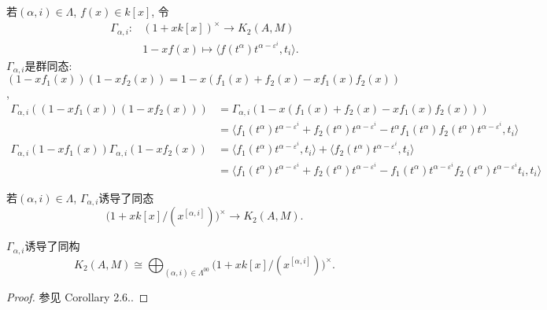 若$(\alpha, i)\in \Lambda$, $f(x)\in k[x]$, 令
\begin{align*}
\Gamma_{\alpha, i} \colon & (1+xk[x])^{\times} \longrightarrow K_2(A,M)\\
				& 1-xf(x)  \mapsto \langle f(t^\alpha)t^{\alpha-\varepsilon^i}, t_i \rangle.
\end{align*}
$\Gamma_{\alpha, i}$是群同态: $(1-xf_1(x))(1-xf_2(x)) = 1-x(f_1(x)+f_2(x)-xf_1(x)f_2(x))$, 
\begin{align*}
	\Gamma_{\alpha, i}((1-xf_1(x))(1-xf_2(x)))&=\Gamma_{\alpha, i}(1-x(f_1(x)+f_2(x)-xf_1(x)f_2(x)))\\
	&=\langle f_1(t^\alpha)t^{\alpha-\varepsilon^i}+f_2(t^\alpha)t^{\alpha-\varepsilon^i}-t^\alpha f_1(t^\alpha)f_2(t^\alpha)t^{\alpha-\varepsilon^i}, t_i \rangle \\
	\Gamma_{\alpha, i}(1-xf_1(x))\Gamma_{\alpha, i}(1-xf_2(x)) & = \langle f_1(t^\alpha)t^{\alpha-\varepsilon^i}, t_i \rangle +\langle f_2(t^\alpha)t^{\alpha-\varepsilon^i}, t_i \rangle\\
	& = \langle f_1(t^\alpha)t^{\alpha-\varepsilon^i}+f_2(t^\alpha)t^{\alpha-\varepsilon^i}-f_1(t^\alpha)t^{\alpha-\varepsilon^i}f_2(t^\alpha)t^{\alpha-\varepsilon^i}t_i, t_i \rangle
\end{align*}


% 

% 
若$(\alpha, i)\in\Lambda$, $\Gamma_{\alpha, i}$诱导了同态
\[\big(1+xk[x]/(x^{[\alpha, i]})\big)^{\times} \longrightarrow K_2(A, M). \]
\begin{theorem}
\label{K2(A, M)}
	$\Gamma_{\alpha, i}$诱导了{\color{red}同构}
\[ K_2(A, M)\cong \bigoplus_{(\alpha, i)\in\Lambda^{00}}\big(1+xk[x]/(x^{[\alpha, i]})\big)^{\times}. \]
\end{theorem}
\begin{proof}
	参见\cite{MR86f:18017} Corollary 2.6.. 
\end{proof}

